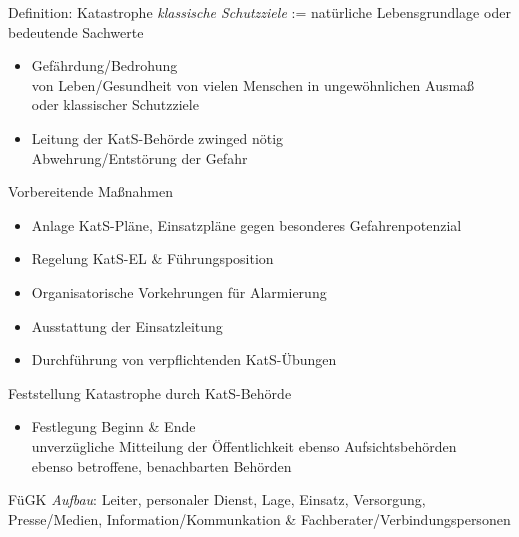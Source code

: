 \begin{warningbox}{Definition: Katastrophe}
    \emph{klassische Schutzziele} := natürliche Lebensgrundlage oder bedeutende Sachwerte
    \begin{itemize} 
        \item Gefährdung/Bedrohung\\
        \ra von Leben/Gesundheit von vielen Menschen in ungewöhnlichen Ausmaß\\
        \ra oder klassischer Schutzziele
        \item Leitung der KatS-Behörde zwinged nötig\\
        \ra Abwehrung/Entstörung der Gefahr  
    \end{itemize}
    \begin{hintbox}{Vorbereitende Maßnahmen}
        \begin{itemize}
            \item Anlage KatS-Pläne, Einsatzpläne gegen besonderes Gefahrenpotenzial
            \item Regelung KatS-EL \& Führungsposition
            \item Organisatorische Vorkehrungen für Alarmierung
            \item Ausstattung der Einsatzleitung
            \item Durchführung von verpflichtenden KatS-Übungen
        \end{itemize}
    \end{hintbox}
    \begin{hintbox}{Feststellung Katastrophe durch KatS-Behörde}
        \begin{itemize}
            \item Festlegung Beginn \& Ende\\
            \ra unverzügliche Mitteilung der Öffentlichkeit
            \ra ebenso Aufsichtsbehörden\\
            \ra ebenso betroffene, benachbarten Behörden
        \end{itemize}
    \end{hintbox}
\end{warningbox}
\begin{sectionbox}{FüGK}
    \emph{Aufbau}: Leiter, personaler Dienst, Lage, Einsatz, Versorgung, Presse/Medien, Information/Kommunkation \& Fachberater/Verbindungspersonen
\end{sectionbox}
